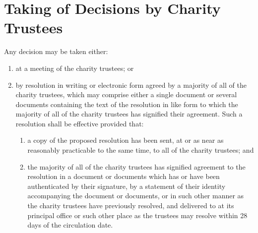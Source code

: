 \section{Taking of Decisions by Charity Trustees}\label{sec:trustee_decisions}
Any decision may be taken either:
\begin{enumerate}
    \item at a meeting of the charity trustees; or
    \item by resolution in writing or electronic form agreed by a majority of all of the charity trustees, which may comprise either a single document or several documents containing the text of the resolution in like form to which the majority of all of the charity trustees has signified their agreement. Such a resolution shall be effective provided that:
        \begin{enumerate}
            \item a copy of the proposed resolution has been sent, at or as near as reasonably practicable to the same time, to all of the charity trustees; and
            \item the majority of all of the charity trustees has signified agreement to the resolution in a document or documents which has or have been authenticated by their signature, by a statement of their identity accompanying the document or documents, or in such other manner as the charity trustees have previously resolved, and delivered to \shortname{} at its principal office or such other place as the trustees may resolve within 28 days of the circulation date.
        \end{enumerate}
\end{enumerate}

